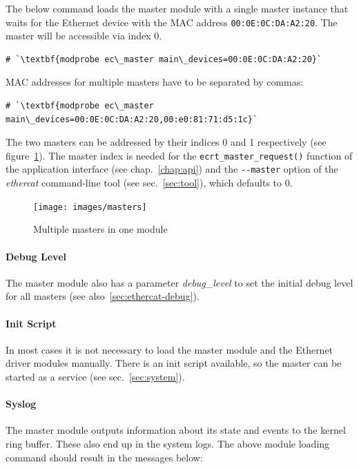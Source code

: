 \documentclass[a4paper,12pt,BCOR6mm,bibtotoc,idxtotoc]{scrbook}
\begin{document}
The below command loads the master module with a single master instance that
waits for the Ethernet device with the MAC address
\lstinline+00:0E:0C:DA:A2:20+. The master will be accessible via index $0$.

\begin{lstlisting}
# `\textbf{modprobe ec\_master main\_devices=00:0E:0C:DA:A2:20}`
\end{lstlisting}

MAC addresses for multiple masters have to be separated by commas:

\begin{lstlisting}
# `\textbf{modprobe ec\_master main\_devices=00:0E:0C:DA:A2:20,00:e0:81:71:d5:1c}`
\end{lstlisting}

The two masters can be addressed by their indices 0 and 1 respectively (see
figure~\ref{fig:masters}). The master index is needed for the
\lstinline+ecrt_master_request()+ function of the application interface (see
chap.~\ref{chap:api}) and the \lstinline+--master+ option of the
\textit{ethercat} command-line tool (see sec.~\ref{sec:tool}), which defaults
to $0$.

\begin{figure}[htbp]
  \centering
  \texttt{[image: images/masters]}
  \caption{Multiple masters in one module}
  \label{fig:masters}
\end{figure}

\paragraph{Debug Level} The master module also has a parameter
\textit{debug\_level} to set the initial debug level for all masters (see
also~\ref{sec:ethercat-debug}).

\paragraph{Init Script}

In most cases it is not necessary to load the master module and the Ethernet
driver modules manually. There is an init script available, so the master can
be started as a service (see sec.~\ref{sec:system}).

\paragraph{Syslog}

The master module outputs information about its state and events to the kernel
ring buffer. These also end up in the system logs.  The above module loading
command should result in the messages below:
\end{document}
